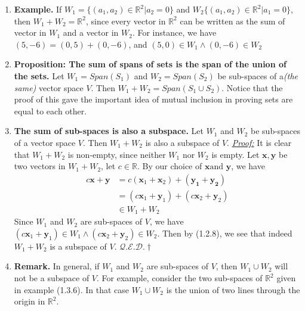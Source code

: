\documentclass[oneside, 12pt]{book}
\newcommand{\settag}[1]{\renewcommand{\theenumi}{#1}}
\newcommand{\R}{\mathbb{R}}
\newcommand{\qed}{\hfill $\mathcal{Q}.\mathcal{E}.\mathcal{D}.\dagger$}
\begin{document}
\begin{enumerate}
        \settag{1.3.6}
        \item \textbf{Example.} If $W_1 = \{(a_1, a_2)\in \R^2|a_2 = 0\}$ and $W_2 \{(a_1, a_2)\in \R^2|a_1 = 0\}$, then $W_1 + W_2= \R^2$, since every vector in $\R^2$ can be written as the sum of vector in $W_1$ and a vector in $W_2$. For instance, we have $(5, -6)=(0, 5)+(0, -6)$, and $(5, 0)\in W_1 \land (0, -6)\in W_2$
        
        
        \settag{1.3.8} 
        \item \textbf{Proposition: The sum of spans of sets is the span of the union of the sets.} Let $W_1 = Span(S_1)$ and $W_2 = Span(S_2)$ be sub-spaces of a\textit{(the same)} vector space $V$. Then $W_1 + W_2 = Span(S_1 \cup S_2)$. Notice that the proof of this gave the important idea of mutual inclusion in proving sets are equal to each other.
        
        \settag{1.3.9}
        \item \textbf{The sum of sub-spaces is also a subspace.} Let $W_1$ and $W_2$ be sub-spaces of a vector space $V$. Then $W_1 + W_2$ is also a subspace of $V$.\newline
        \underline{\textit{Proof:}}\newline
        It is clear that $W_1 + W_2$ is non-empty, since neither $W_1$ nor $W_2$ is empty. Let $\mathbf{x}, \mathbf{y}$ be two vectors in $W_1+W_2$, let $c\in \R$. By our choice of $\mathbf{x}\text{and } \mathbf{y}$, we have
        \begin{align*}
            c\mathbf{x} + \mathbf{y} & = c(\mathbf{x}_1 + \mathbf{x}_2) + (\mathbf{y_1} + \mathbf{y_2}) \\
            & = (c\mathbf{x}_1 + \mathbf{y}_1) + (c\mathbf{x}_2 + \mathbf{y}_2) \\
            &\in W_1+W_2
        \end{align*}
        Since $W_1$ and $W_2$ are sub-spaces of $V$, we have $(c\mathbf{x}_1 + \mathbf{y}_1) \in W_1\land (c\mathbf{x}_2 + \mathbf{y}_2)\in W_2$. Then by (1.2.8), we see that indeed $W_1 + W_2$ is a subspace of $V$. \qed
        
        \settag{1.3.10}
        \item \textbf{Remark.} In general, if $W_1$ and $W_2$ are sub-spaces of $V$, then $W_1 \cup W_2$ will not be a subspace of $V$. For example, consider the two sub-spaces of $\R^2$ given in example (1.3.6). In that case $W_1\cup W_2$ is the union of two lines through the origin in $\R^2$. 
        

\end{enumerate}
\end{document}
